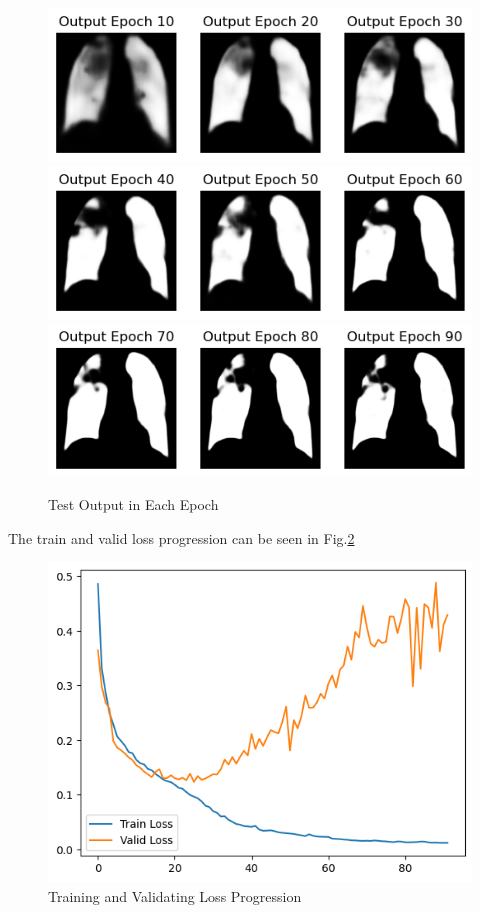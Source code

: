 \documentclass{article}
\begin{document}
\begin{multicols}{2}
\begin{figure}[H]
    \includegraphics[width=\linewidth]{Unknown-32.png}
    \includegraphics[width=\linewidth]{Unknown-33.png}
    \includegraphics[width=\linewidth]{Unknown-34.png}
    \caption{Test Output in Each Epoch}
    \label{fig:test outputs}
\end{figure}
The train and valid loss progression can be seen in Fig.\ref{fig:loss}
\begin{figure}[H]
    \centering
    \includegraphics[width=\linewidth]{Unknown-30.png}
    \caption{Training and Validating Loss Progression}
    \label{fig:loss}
\end{figure}

\end{multicols}
\end{document}
